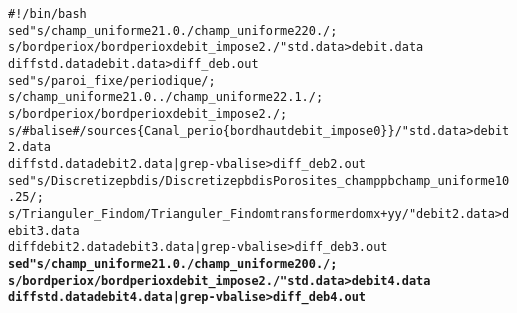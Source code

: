 \begin{alltt}
#!/bin/bash
sed "s/champ_uniforme 2 1. 0./ champ_uniforme 2 2 0./;
    s/bord periox/ bord periox debit_impose 2./" std.data >  debit.data
diff std.data debit.data > diff_deb.out
sed "s/paroi_fixe/periodique/;
    s/champ_uniforme 2 1. 0../ champ_uniforme 2 2. 1./;
    s/bord periox/ bord periox debit_impose 2./;
    s/# balise #/sources \{ Canal_perio \{  bord haut debit_impose 0 \} \}/" std.data > debit2.data
diff std.data debit2.data | grep -v balise > diff_deb2.out
sed "s/Discretize pb dis/Discretize pb dis Porosites_champ pb champ_uniforme 1 0.25/;
    s/Trianguler_Fin dom/Trianguler_Fin dom transformer dom x+y y/" debit2.data > debit3.data 
diff debit2.data debit3.data | grep -v balise > diff_deb3.out
{\bf{sed "s/champ_uniforme 2 1. 0./ champ_uniforme 2 0 0./;
    s/bord periox/ bord periox debit_impose 2./" std.data >  debit4.data
diff std.data debit4.data  | grep -v balise > diff_deb4.out }}
\end{alltt}
